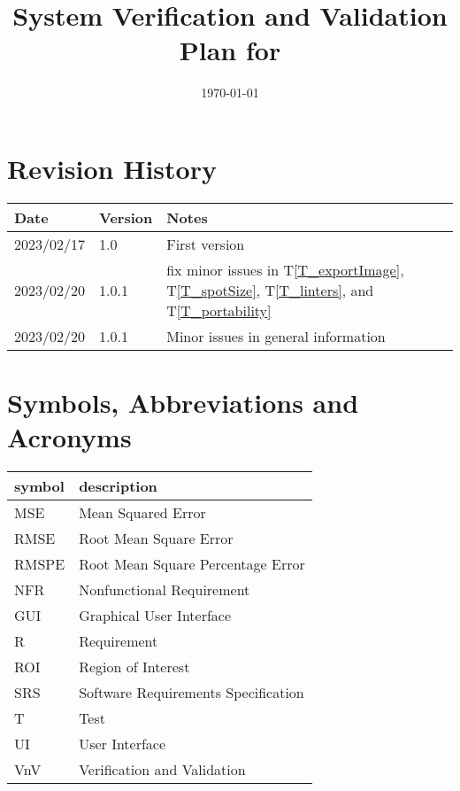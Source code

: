 \documentclass[12pt, titlepage]{article}
\begin{document}
\title{System Verification and Validation Plan for \progname{}} 
\author{\authname}
\date{\today}
	
\maketitle


\section{Revision History}

\begin{tabularx}{\textwidth}{p{3cm}p{2cm}X}
\toprule {\bf Date} & {\bf Version} & {\bf Notes}\\
\midrule
2023/02/17 & 1.0 & First version \\
2023/02/20 & 1.0.1 & fix minor issues in T\ref{T_exportImage}, T\ref{T_spotSize}, T\ref{T_linters}, 
  and T\ref{T_portability}\\
2023/02/20 & 1.0.1 & Minor issues in general information
\bottomrule
\end{tabularx}

\newpage

\tableofcontents

\listoftables

\newpage

\section{Symbols, Abbreviations and Acronyms}

\renewcommand{\arraystretch}{1.2}
\begin{tabular}{l l} 
  \toprule		
  \textbf{symbol} & \textbf{description}\\
  \midrule 
  MSE & Mean Squared Error\\
  RMSE & Root Mean Square Error\\
  RMSPE & Root Mean Square Percentage Error\\
  NFR & Nonfunctional Requirement\\
  GUI & Graphical User Interface\\
  R & Requirement\\
  ROI & Region of Interest\\
  SRS & Software Requirements Specification\\
  T & Test\\
  UI & User Interface\\
  VnV & Verification and Validation\\
  \bottomrule
\end{tabular}\\
\end{document}
